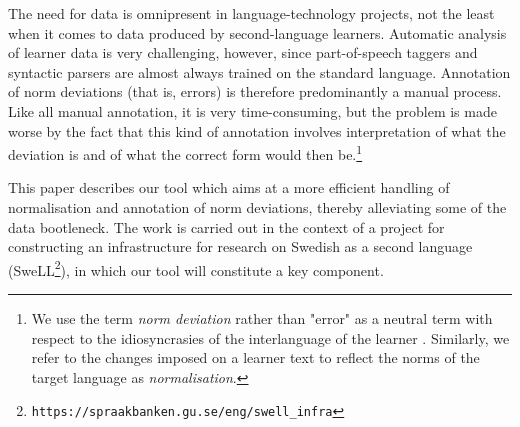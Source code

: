 \documentclass[10pt, a4paper]{article}
\newcommand{\normAnn}[0]{our tool }
\begin{document}
The need for data is omnipresent in language-technology projects, not the least when it comes to data produced by second-language learners.
Automatic analysis of learner data is very challenging, however, since part-of-speech taggers and syntactic parsers are almost always trained on the standard language. Annotation of norm deviations (that is, errors) is therefore predominantly a manual process. Like all manual annotation, it is very time-consuming, but the problem is made worse by the fact that this kind of annotation involves interpretation of what the deviation is and of what the correct form would then be.\footnote{We use the term {\em norm deviation} rather than "error" as a neutral term with respect to the idiosyncrasies of the interlanguage of the learner \cite{Selinker1972}. Similarly, we refer to the changes imposed on a learner text to reflect the norms of the target language as {\em normalisation}. }

This paper describes %
\normAnn which aims at a more efficient handling of normalisation and annotation of norm deviations, thereby alleviating some of the data bootleneck. The work is carried out in the context of a project for constructing an infrastructure for research on Swedish as a second language (SweLL\footnote{%
{\tt https://spraakbanken.gu.se/eng/swell\_infra}}), in which \normAnn will constitute a key component.


\end{document}
